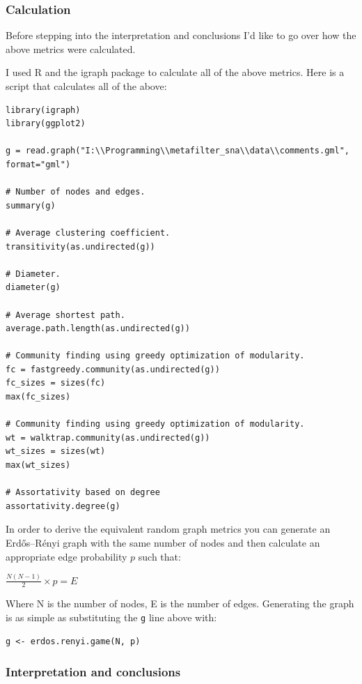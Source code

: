 \subsubsection{Calculation}

Before stepping into the interpretation and conclusions I'd like to go
over how the above metrics were calculated.

I used R and the igraph package to calculate all of the above metrics.
Here is a script that calculates all of the above:

\begin{verbatim}
library(igraph)
library(ggplot2)

g = read.graph("I:\\Programming\\metafilter_sna\\data\\comments.gml", format="gml")

# Number of nodes and edges.
summary(g)

# Average clustering coefficient.
transitivity(as.undirected(g))

# Diameter.
diameter(g)

# Average shortest path.
average.path.length(as.undirected(g))

# Community finding using greedy optimization of modularity.
fc = fastgreedy.community(as.undirected(g))    
fc_sizes = sizes(fc)
max(fc_sizes)

# Community finding using greedy optimization of modularity.
wt = walktrap.community(as.undirected(g))
wt_sizes = sizes(wt)
max(wt_sizes)

# Assortativity based on degree
assortativity.degree(g)
\end{verbatim}

In order to derive the equivalent random graph metrics you can generate
an Erdős--Rényi graph with the same number of nodes and then calculate
an appropriate edge probability $p$ such that:

$\frac{N(N-1)}{2} \times p = E$

Where N is the number of nodes, E is the number of edges. Generating the
graph is as simple as substituting the \texttt{g} line above with:

\begin{verbatim}
g <- erdos.renyi.game(N, p)
\end{verbatim}

\subsubsection{Interpretation and conclusions}

